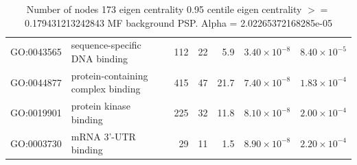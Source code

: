 \begin{table}[ht]
\begin{tabular}{llrrrrr}
  GO:0043565 & sequence-specific DNA binding & 112 & 22 & 5.9 & $3.40 \times 10^{-8}$ & $8.40 \times 10^{-5}$ \\ 
  GO:0044877 & protein-containing complex binding & 415 & 47 & 21.7 & $7.40 \times 10^{-8}$ & $1.83 \times 10^{-4}$ \\ 
  GO:0019901 & protein kinase binding & 225 & 32 & 11.8 & $8.10 \times 10^{-8}$ & $2.00 \times 10^{-4}$ \\ 
  GO:0003730 & mRNA 3'-UTR binding & 29 & 11 & 1.5 & $8.90 \times 10^{-8}$ & $2.20 \times 10^{-4}$ \\ 
   \hline
\end{tabular}
\caption{Number of nodes 173 eigen centrality 0.95 centile  eigen centrality $>=$ 0.179431213242843 MF background PSP. Alpha = 2.02265372168285e-05} 
\label{tab:Number of nodes 173 eigen centrality 0.95 centile  eigen centrality $>=$ 0.179431213242843 MF background PSP. Alpha = 2.02265372168285e-05}
\end{table}



